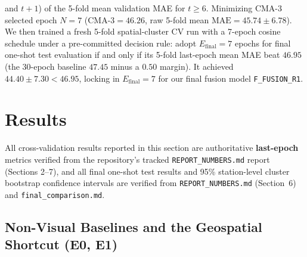 \documentclass[conference]{IEEEtran}
\begin{document}
\begin{enumerate}
        and $t + 1$) of the 5-fold mean validation MAE for $t \ge 6$. Minimizing
        CMA-3 selected epoch $N = 7$ ($\text{CMA-3} = 46.26$, raw 5-fold mean
        $\text{MAE} = 45.74 \pm 6.78$). We then trained a fresh 5-fold
        spatial-cluster CV run with a 7-epoch cosine schedule under a
        pre-committed decision rule: adopt $E_{\text{final}} = 7$ epochs for
        final one-shot test evaluation if and only if its 5-fold last-epoch mean
        MAE beat $46.95$ (the 30-epoch baseline $47.45$ minus a $0.50$ margin).
        It achieved $44.40 \pm 7.30 < 46.95$, locking in $E_{\text{final}} = 7$
        for our final fusion model \texttt{F\_FUSION\_R1}.
\end{enumerate}

\section{Results}
\label{sec:results}

All cross-validation results reported in this section are authoritative
\textbf{last-epoch} metrics verified from the repository's tracked
\texttt{REPORT\_NUMBERS.md} report (Sections 2--7), and all final one-shot test
results and 95\% station-level cluster bootstrap confidence intervals are
verified from \texttt{REPORT\_NUMBERS.md} (Section~6) and
\texttt{final\_comparison.md}.

\subsection{Non-Visual Baselines and the Geospatial Shortcut (E0, E1)}
\label{subsec:results_baselines}
\end{document}
